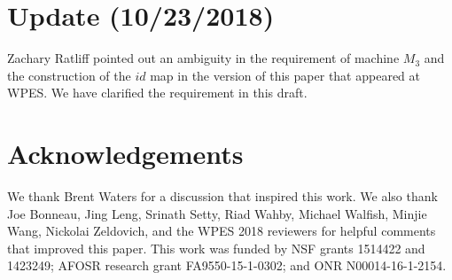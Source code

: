 \section*{Update (10/23/2018)}
Zachary Ratliff pointed out an ambiguity in the requirement of machine $M_3$
  and the construction of the $id$ map in the version of this paper that 
  appeared at WPES.
We have clarified the requirement in this draft.

\section*{Acknowledgements}
We thank Brent Waters for a discussion that inspired this work.
We also thank Joe Bonneau, Jing Leng, Srinath Setty, Riad Wahby, Michael
  Walfish, Minjie Wang, Nickolai Zeldovich, and the WPES 2018 reviewers for
  helpful comments that improved this paper.
This work was funded by NSF grants 1514422 and 1423249; AFOSR research grant
  FA9550-15-1-0302; and ONR N00014-16-1-2154.
